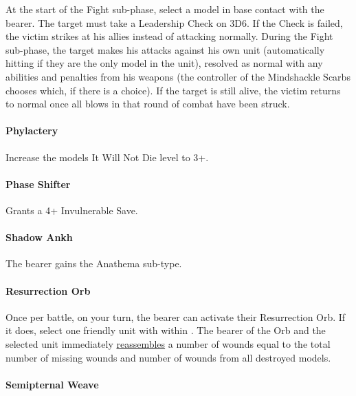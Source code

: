 At the start of the Fight sub-phase, select a model in base contact with the bearer. The target must take a Leadership Check on 3D6. If the Check is failed, the victim strikes at his allies instead of attacking normally. During the Fight sub-phase, the target makes his attacks against his own unit (automatically hitting if they are the only model in the unit), resolved as normal with any abilities and penalties from his weapons (the controller of the Mindshackle Scarbs chooses which, if there is a choice). If the target is still alive, the victim returns to normal once all blows in that round of combat have been struck.

\paragraph*{Phylactery} \label{Phylactery}

Increase the models It Will Not Die level to 3+.

\paragraph*{Phase Shifter} \label{Phase Shifter}

Grants a 4+ Invulnerable Save.

\paragraph*{Shadow Ankh} \label{Shadow Ankh}

The bearer gains the Anathema sub-type.

\paragraph*{Resurrection Orb} \label{Resurrection Orb}

Once per battle, on your turn, the bearer can activate their Resurrection Orb. If it does, select one friendly unit with  within . The bearer of the Orb and the selected unit immediately \textcolor{violet}{\hyperref[Reanimation Protocols]{reassembles}} a number of wounds equal to the total number of missing wounds and number of wounds from all destroyed models.

\paragraph*{Semipternal Weave} \label{Sempiternal Weave}

